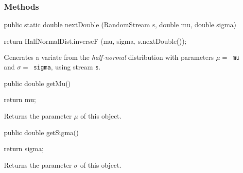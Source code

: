 \subsubsection* {Methods}
\begin{code}

   public static double nextDouble (RandomStream s, double mu, double sigma)\begin{hide} {
      return HalfNormalDist.inverseF (mu, sigma, s.nextDouble());
   }\end{hide}
\end{code}
\begin{tabb} Generates a variate from the {\em half-normal\/} distribution with
 parameters $\mu = $~\texttt{mu} and $\sigma = $~\texttt{sigma}, 
using stream \texttt{s}.
\end{tabb}
\begin{htmlonly}
\end{htmlonly}
\begin{code}

   public double getMu()\begin{hide} {
      return mu;
   }\end{hide}
\end{code}
  \begin{tabb} Returns the parameter $\mu$ of this object.
  \end{tabb}
\begin{htmlonly}
\end{htmlonly}
\begin{code}

   public double getSigma()\begin{hide} {
      return sigma;
   }\end{hide}
\end{code}
  \begin{tabb} Returns the parameter $\sigma$ of this object.
  \end{tabb}
\begin{htmlonly}
\end{htmlonly}
\begin{code}\begin{hide}

   protected void setParams (double mu, double sigma) {
      if (sigma <= 0.0)
         throw new IllegalArgumentException ("sigma <= 0");
      this.mu = mu;
      this.sigma = sigma;
   }
}\end{hide}
\end{code}
